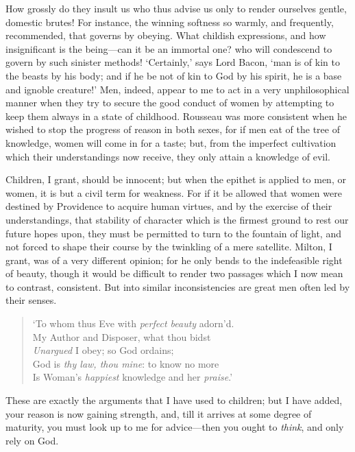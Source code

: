 How grossly do they insult us who thus advise us only to render
ourselves gentle, domestic  brutes! For instance, the winning
softness so warmly, and frequently, recommended, that governs by
obeying. What childish expressions, and how insignificant is the
be\-ing---can it be an immortal one? who will condescend to govern by
such sinister methods! `Certainly,' says Lord Bacon, `man is of kin to
the beasts by his body; and if he be not of kin to God by his spirit,
he is a base and ignoble creature!' Men, indeed, appear to me to act
in a very unphilosophical manner when they try to secure the good
conduct of women by attempting to keep them always in a state of
childhood. Rousseau was more consistent when he wished to stop the
progress of reason in both sexes, for if men eat of the tree of
knowledge, women will come in for a taste; but, from the imperfect
cultivation which their understandings now receive, they only attain a
knowledge of evil.

Children, I grant, should be innocent; but when the epithet is applied
to men, or women, it is but a civil term for weakness. For if it be
allowed that women were destined by Providence to acquire human
virtues, and by the exercise of their understandings, that stability
of character which is the firmest  ground to rest our future
hopes upon, they must be permitted to turn to the fountain of light,
and not forced to shape their course by the twinkling of a mere
satellite. Milton, I grant, was of a very different opinion; for he
only bends to the indefeasible right of beauty, though it would be
difficult to render two passages which I now mean to contrast,
consistent. But into similar inconsistencies are great men often led
by their senses.

\begin{verse}
`To whom thus Eve with \textit{perfect beauty} adorn'd.\\
My Author and Disposer, what thou bidst\\
\textit{Unargued} I obey; so God ordains;\\
God is \textit{thy law, thou mine}: to know no more\\
Is Woman's \textit{happiest} knowledge and her \textit{praise}.'
\end{verse}

These are exactly the arguments that I have used to children; but I
have added, your reason is now gaining strength, and, till it arrives
at some degree of maturity, you must look up to me for ad\-vice---then
you ought to \textit{think}, and only rely on God.

